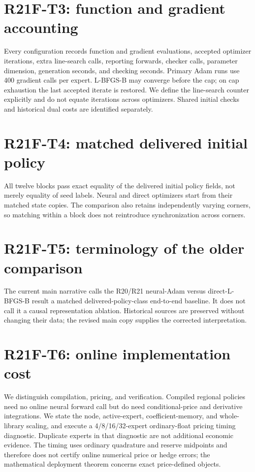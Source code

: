\documentclass[ecta]{econsocart}
\theoremstyle{remark}
\begin{document}
\section{R21F-T3: function and gradient accounting}

Every configuration records function and gradient evaluations, accepted optimizer iterations, extra line-search calls, reporting forwards, checker calls, parameter dimension, generation seconds, and checking seconds. Primary Adam runs use 400 gradient calls per expert. L-BFGS-B may converge before the cap; on cap exhaustion the last accepted iterate is restored. We define the line-search counter explicitly and do not equate iterations across optimizers. Shared initial checks and historical dual costs are identified separately.

\section{R21F-T4: matched delivered initial policy}

All twelve blocks pass exact equality of the delivered initial policy fields, not merely equality of seed labels. Neural and direct optimizers start from their matched state copies. The comparison also retains independently varying corners, so matching within a block does not reintroduce synchronization across corners.

\section{R21F-T5: terminology of the older comparison}

The current main narrative calls the R20/R21 neural-Adam versus direct-L-BFGS-B result a matched delivered-policy-class end-to-end baseline. It does not call it a causal representation ablation. Historical sources are preserved without changing their data; the revised main copy supplies the corrected interpretation.

\section{R21F-T6: online implementation cost}

We distinguish compilation, pricing, and verification. Compiled regional policies need no online neural forward call but do need conditional-price and derivative integrations. We state the node, active-expert, coefficient-memory, and whole-library scaling, and execute a 4/8/16/32-expert ordinary-float pricing timing diagnostic. Duplicate experts in that diagnostic are not additional economic evidence. The timing uses ordinary quadrature and reserve midpoints and therefore does not certify online numerical price or hedge errors; the mathematical deployment theorem concerns exact price-defined objects.
\end{document}
